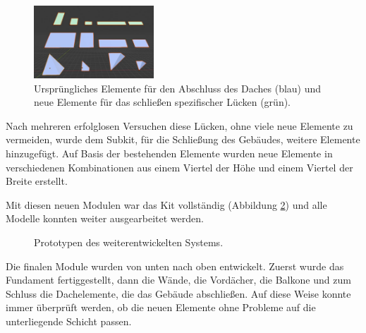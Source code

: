 \par
\begin{figure}
  \centering 
   \vspace{-12.5pt}
    \includegraphics[width=0.4\textwidth]{bilder/DacheElemente}
      \caption{Ursprüngliches Elemente für den Abschluss des Daches (blau) und neue Elemente für das schließen spezifischer Lücken (grün).}\label{DacheElemente}
          \vspace{-14pt}
\end{figure}
Nach mehreren erfolglosen Versuchen diese Lücken, ohne viele neue Elemente zu vermeiden, wurde dem Subkit, für die Schließung des Gebäudes, weitere Elemente hinzugefügt. Auf Basis der bestehenden Elemente wurden neue Elemente in verschiedenen Kombinationen aus einem Viertel der Höhe und einem Viertel der Breite erstellt.
\par
Mit diesen neuen Modulen war das Kit vollständig (Abbildung \ref{finalmodul}) und alle Modelle konnten weiter ausgearbeitet werden.
\begin{figure}[H]
\centering
  \caption{Prototypen des weiterentwickelten Systems.}
	\label{finalmodul}
\end{figure}
\vspace{-10.5pt}
Die finalen Module wurden von unten nach oben entwickelt. Zuerst wurde das Fundament fertiggestellt, dann die Wände, die Vordächer, die Balkone und zum Schluss die Dachelemente, die das Gebäude abschließen. Auf diese Weise konnte immer überprüft werden, ob die neuen Elemente ohne Probleme auf die unterliegende Schicht passen.
